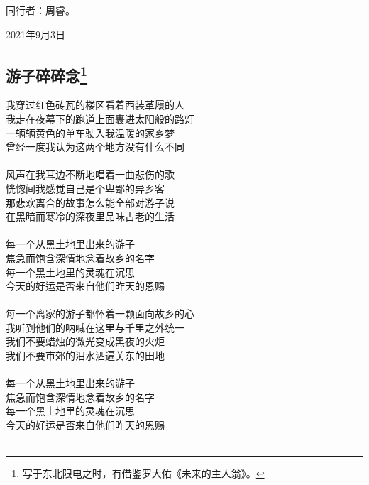 \documentclass[a5paper]{ctexart}
\begin{document}
	同行者：周睿。
	\begin{flushright}
		2021年9月3日
	\end{flushright}

	\subsection[游子碎碎念]{游子碎碎念\footnote{写于东北限电之时，有借鉴罗大佑《未来的主人翁》。}}
	\begin{center}
		我穿过红色砖瓦的楼区看着西装革履的人\\
		我走在夜幕下的跑道上面裹进太阳般的路灯\\
		一辆辆黄色的单车驶入我温暖的家乡梦\\
		曾经一度我认为这两个地方没有什么不同\\ \hspace*{\fill} \\
		
		风声在我耳边不断地唱着一曲悲伤的歌\\
		恍惚间我感觉自己是个卑鄙的异乡客\\
		那悲欢离合的故事怎么能全部对游子说\\
		在黑暗而寒冷的深夜里品味古老的生活\\ \hspace*{\fill} \\
		
		每一个从黑土地里出来的游子\\
		焦急而饱含深情地念着故乡的名字\\
		每一个黑土地里的灵魂在沉思\\
		今天的好运是否来自他们昨天的恩赐\\ \hspace*{\fill} \\
		
		每一个离家的游子都怀着一颗面向故乡的心\\
		我听到他们的呐喊在这里与千里之外统一\\
		我们不要蜡烛的微光变成黑夜的火炬\\
		我们不要市郊的泪水洒遍关东的田地\\ \hspace*{\fill} \\
		
		每一个从黑土地里出来的游子\\
		焦急而饱含深情地念着故乡的名字\\
		每一个黑土地里的灵魂在沉思\\
		今天的好运是否来自他们昨天的恩赐\\ \hspace*{\fill} \\
		

\end{center}
\end{document}
